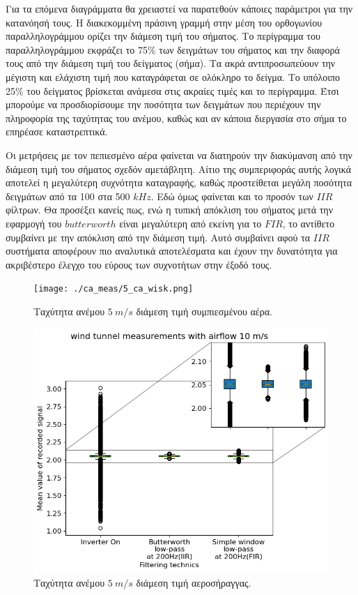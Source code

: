 \documentclass[breaklines=true, 12pt]{article}
\begin{document}
{{{Για τα επόμενα διαγράμματα θα χρειαστεί να παρατεθούν κάποιες παράμετροι για
την κατανόησή τους. Η διακεκομμένη πράσινη γραμμή στην μέση του ορθογωνίου
παραλληλογράμμου ορίζει την διάμεση τιμή του σήματος. Το περίγραμμα του
παραλληλογράμμου εκφράζει το 75\% των δειγμάτων του σήματος και την διαφορά τους
από την διάμεση τιμή του δείγματος (σήμα). Τα ακρά αντιπροσωπεύουν την
μέγιστη και ελάχιστη τιμή που καταγράφεται σε ολόκληρο το δείγμα. Το υπόλοιπο
25\% του δείγματος βρίσκεται ανάμεσα στις ακραίες τιμές και το περίγραμμα. Έτσι
μπορούμε να προσδιορίσουμε την ποσότητα των δειγμάτων που περιέχουν την
πληροφορία της ταχύτητας του ανέμου, καθώς και αν κάποια διεργασία στο σήμα
το επηρέασε καταστρεπτικά.

Οι μετρήσεις με τον πεπιεσμένο αέρα φαίνεται να διατηρούν την διακύμανση από
την διάμεση τιμή του σήματος σχεδόν αμετάβλητη. Αίτιο της συμπεριφοράς αυτής
λογικά αποτελεί η μεγαλύτερη συχνότητα καταγραφής, καθώς προστείθεται μεγάλη
ποσότητα δειγμάτων από τα 100 στα 500 \(kHz\). Εδώ όμως φαίνεται και το προσόν
των \(IIR\) φίλτρων. Θα προσέξει κανείς πως, ενώ η τυπική απόκλιση του σήματος
μετά την εφαρμογή του \(butterworth\) είναι μεγαλύτερη από εκείνη για το \(FIR\), το
αντίθετο συμβαίνει με την απόκλιση από την διάμεση τιμή. Αυτό συμβαίνει αφού
τα \(IIR\) συστήματα αποφέρουν πιο αναλυτικά αποτελέσματα και έχουν την
δυνατότητα για ακριβέστερο έλεγχο του εύρους των συχνοτήτων στην έξοδό τους.
\begin{figure}[t]
\centerline{\texttt{[image: ./ca\_meas/5\_ca\_wisk.png]}}
\caption{Ταχύτητα ανέμου \(5\ m/s\) διάμεση τιμή συμπιεσμένου αέρα.}
\label{fig:ca-0-mean}
\end{figure}


\begin{figure}[t]
\centerline{\includegraphics[scale=.9]{./src/whiskr.png}}
\caption{Ταχύτητα ανέμου \(5\ m/s\) διάμεση τιμή αεροσήραγγας.}
\label{fig:ca-0-mean}
\end{figure}
\clearpage
}}}
\end{document}
